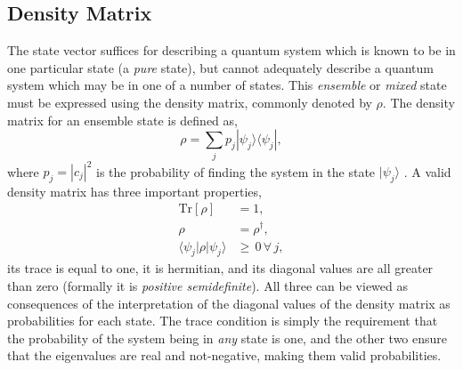 \subsection{Density Matrix}
The state vector suffices for describing a quantum system which is known to be in one particular state (a \emph{pure} state), but cannot adequately describe a quantum system which may be in one of a number of states. This \emph{ensemble} or \emph{mixed} state must be expressed using the density matrix, commonly denoted by \(\rho\). The density matrix for an ensemble state is defined as,
\begin{equation}
	\rho = \sum_{j} p_{j} |\psi_{j} \rangle \langle \psi_{j}|,
	\label{eq:oqs2-1}
\end{equation}
where \(p_{j} = |c_{j}|^{2}\) is the probability of finding the system in the state \(|\psi_{j}\rangle\) \cite{NielsenChuang_DM}. A valid density matrix has three important properties,
\begin{align}
	\mathrm{Tr}[\rho] &= 1, \label{eq:oqs2-2} \\
	\rho &= \rho^{\dagger}, \label{eq:oqs2-3} \\
	\langle \psi_{j}| \rho | \psi_{j} \rangle &\geq \, 0 \, \forall \, j, \label{eq:oqs2-4}
\end{align}
its trace is equal to one, it is hermitian, and its diagonal values are all greater than zero (formally it is \emph{positive semidefinite}). All three can be viewed as consequences of the interpretation of the diagonal values of the density matrix as probabilities for each state. The trace condition is simply the requirement that the probability of the system being in \emph{any} state is one, and the other two ensure that the eigenvalues are real and not-negative, making them valid probabilities.

